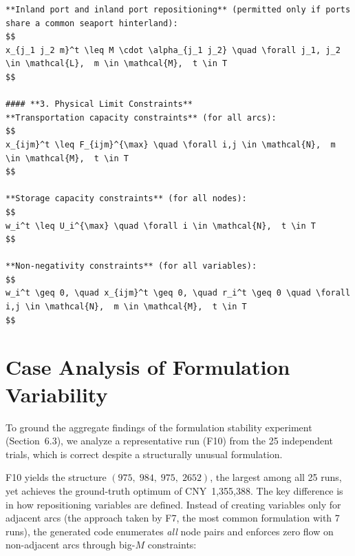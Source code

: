 \documentclass[preprint,12pt]{elsarticle}
\begin{document}
\begin{nolinenumbers}
\begin{promptbox}
\begin{lstlisting}[style=prompttemplate]
**Inland port and inland port repositioning** (permitted only if ports share a common seaport hinterland):
$$
x_{j_1 j_2 m}^t \leq M \cdot \alpha_{j_1 j_2} \quad \forall j_1, j_2 \in \mathcal{L},  m \in \mathcal{M},  t \in T
$$

#### **3. Physical Limit Constraints**
**Transportation capacity constraints** (for all arcs):
$$
x_{ijm}^t \leq F_{ijm}^{\max} \quad \forall i,j \in \mathcal{N},  m \in \mathcal{M},  t \in T
$$

**Storage capacity constraints** (for all nodes):
$$
w_i^t \leq U_i^{\max} \quad \forall i \in \mathcal{N},  t \in T
$$

**Non-negativity constraints** (for all variables):
$$
w_i^t \geq 0, \quad x_{ijm}^t \geq 0, \quad r_i^t \geq 0 \quad \forall i,j \in \mathcal{N},  m \in \mathcal{M},  t \in T
$$

\end{lstlisting}
\end{promptbox}
\label{lst:ecr-mathematical-model}
\end{nolinenumbers}

\section{Case Analysis of Formulation Variability}\label{app4}

To ground the aggregate findings of the formulation stability experiment (Section~6.3), we analyze a representative run (F10) from the 25 independent trials, which is correct despite a structurally unusual formulation.

F10 yields the structure $(975,\;984,\;975,\;2652)$, the largest among all 25 runs, yet achieves the ground-truth optimum of CNY~1,355,388. The key difference is in how repositioning variables are defined. Instead of creating variables only for adjacent arcs (the approach taken by F7, the most common formulation with 7 runs), the generated code enumerates \emph{all} node pairs and enforces zero flow on non-adjacent arcs through big-$M$ constraints:
\end{document}
